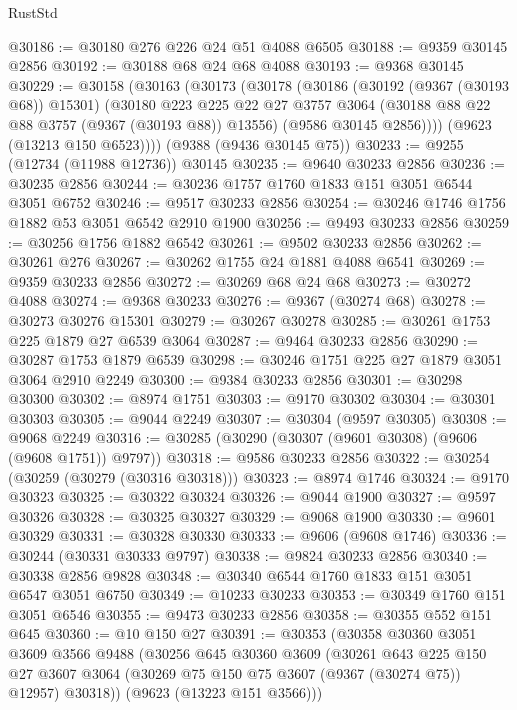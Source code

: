 \begin{lexlean}{RustStd}
\begin{coremodule}
@30186 := @30180 @276 @226 @24 @51 @4088 @6505
@30188 := @9359 @30145 @2856
@30192 := @30188 @68 @24 @68 @4088
@30193 := @9368 @30145
@30229 := @30158
    (@30163
      (@30173
        (@30178
          (@30186
            (@30192 (@9367 (@30193 @68)) @15301)
            (@30180
              @223
              @225
              @22
              @27
              @3757
              @3064
              (@30188 @88 @22 @88 @3757 (@9367 (@30193 @88)) @13556)
              (@9586 @30145 @2856))))
        (@9623 (@13213 @150 @6523))))
    (@9388 (@9436 @30145 @75))
@30233 := @9255 (@12734 (@11988 @12736)) @30145
@30235 := @9640 @30233 @2856
@30236 := @30235 @2856
@30244 := @30236 @1757 @1760 @1833 @151 @3051 @6544 @3051 @6752
@30246 := @9517 @30233 @2856
@30254 := @30246 @1746 @1756 @1882 @53 @3051 @6542 @2910 @1900
@30256 := @9493 @30233 @2856
@30259 := @30256 @1756 @1882 @6542
@30261 := @9502 @30233 @2856
@30262 := @30261 @276
@30267 := @30262 @1755 @24 @1881 @4088 @6541
@30269 := @9359 @30233 @2856
@30272 := @30269 @68 @24 @68
@30273 := @30272 @4088
@30274 := @9368 @30233
@30276 := @9367 (@30274 @68)
@30278 := @30273 @30276 @15301
@30279 := @30267 @30278
@30285 := @30261 @1753 @225 @1879 @27 @6539 @3064
@30287 := @9464 @30233 @2856
@30290 := @30287 @1753 @1879 @6539
@30298 := @30246 @1751 @225 @27 @1879 @3051 @3064 @2910 @2249
@30300 := @9384 @30233 @2856
@30301 := @30298 @30300
@30302 := @8974 @1751
@30303 := @9170 @30302
@30304 := @30301 @30303
@30305 := @9044 @2249
@30307 := @30304 (@9597 @30305)
@30308 := @9068 @2249
@30316 := @30285 (@30290 (@30307 (@9601 @30308) (@9606 (@9608 @1751)) @9797))
@30318 := @9586 @30233 @2856
@30322 := @30254 (@30259 (@30279 (@30316 @30318)))
@30323 := @8974 @1746
@30324 := @9170 @30323
@30325 := @30322 @30324
@30326 := @9044 @1900
@30327 := @9597 @30326
@30328 := @30325 @30327
@30329 := @9068 @1900
@30330 := @9601 @30329
@30331 := @30328 @30330
@30333 := @9606 (@9608 @1746)
@30336 := @30244 (@30331 @30333 @9797)
@30338 := @9824 @30233 @2856
@30340 := @30338 @2856 @9828
@30348 := @30340 @6544 @1760 @1833 @151 @3051 @6547 @3051 @6750
@30349 := @10233 @30233
@30353 := @30349 @1760 @151 @3051 @6546
@30355 := @9473 @30233 @2856
@30358 := @30355 @552 @151 @645
@30360 := @10 @150 @27
@30391 := @30353
    (@30358
      @30360
      @3051
      @3609
      @3566
      @9488
      (@30256
        @645
        @30360
        @3609
        (@30261
          @643
          @225
          @150
          @27
          @3607
          @3064
          (@30269 @75 @150 @75 @3607 (@9367 (@30274 @75)) @12957)
          @30318))
      (@9623 (@13223 @151 @3566)))

\end{coremodule}
\end{lexlean}
